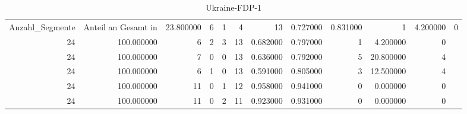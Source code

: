 \begin{table}
\caption{Ukraine-FDP-1}
\label{tab:meine_tabelle}
\begin{tabular}{rrrrrrrrrrr}
\toprule
Anzahl_Segmente & Anteil an Gesamt in %
 & 23.800000 & 6 & 1 & 4 & 13 & 0.727000 & 0.831000 & 1 & 4.200000 & 0 \\
24 & 100.000000 & 6 & 2 & 3 & 13 & 0.682000 & 0.797000 & 1 & 4.200000 & 0 \\
24 & 100.000000 & 7 & 0 & 0 & 13 & 0.636000 & 0.792000 & 5 & 20.800000 & 4 \\
24 & 100.000000 & 6 & 1 & 0 & 13 & 0.591000 & 0.805000 & 3 & 12.500000 & 4 \\
24 & 100.000000 & 11 & 0 & 1 & 12 & 0.958000 & 0.941000 & 0 & 0.000000 & 0 \\
24 & 100.000000 & 11 & 0 & 2 & 11 & 0.923000 & 0.931000 & 0 & 0.000000 & 0 \\
\bottomrule
\end{tabular}
\end{table}
